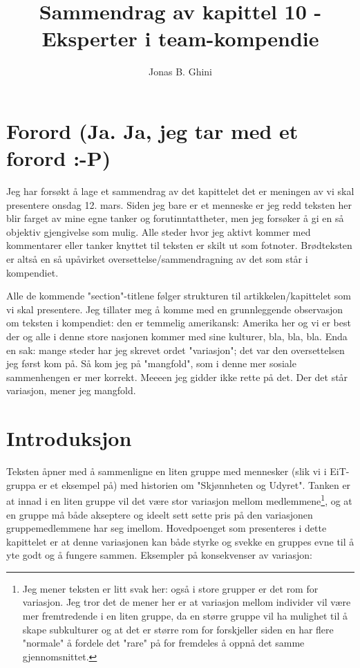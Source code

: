 \documentclass[11pt]{article}
\title{Sammendrag av kapittel 10 - Eksperter i team-kompendie}
\author{Jonas B. Ghini}
\begin{document}
\maketitle

	\section{Forord (Ja. Ja, jeg tar med et forord :-P)}
		Jeg har forsøkt å lage et sammendrag av det kapittelet det er meningen av vi skal presentere onsdag 12. mars. Siden jeg bare er et menneske er jeg redd teksten her blir farget av mine egne tanker og forutinntattheter, men jeg forsøker å gi en så objektiv gjengivelse som mulig. Alle steder hvor jeg aktivt kommer med kommentarer eller tanker knyttet til teksten er skilt ut som fotnoter. Brødteksten er altså en så upåvirket oversettelse/sammendragning av det som står i kompendiet.
		
		 Alle de kommende "section"-titlene følger strukturen til artikkelen/kapittelet som vi skal presentere. Jeg tillater meg å komme med en grunnleggende observasjon om teksten i kompendiet: den er temmelig amerikansk: Amerika her og vi er best der og alle i denne store nasjonen kommer med sine kulturer, bla, bla, bla. Enda en sak: mange steder har jeg skrevet ordet "variasjon"; det var den oversettelsen jeg først kom på. Så kom jeg på "mangfold", som i denne mer sosiale sammenhengen er mer korrekt. Meeeen jeg gidder ikke rette på det. Der det står variasjon, mener jeg mangfold.
				
	\section{Introduksjon}
		Teksten åpner med å sammenligne en liten gruppe med mennesker (slik vi i EiT-gruppa er et eksempel på) med historien om "Skjønnheten og Udyret". Tanken er at innad i en liten gruppe vil det være stor variasjon mellom medlemmene\footnote{Jeg mener teksten er litt svak her: også i store grupper er det rom for variasjon. Jeg tror det de mener her er at variasjon mellom individer vil være mer fremtredende i en liten gruppe, da en større gruppe vil ha mulighet til å skape subkulturer og at det er større rom for forskjeller siden en har flere "normale" å fordele det "rare" på for fremdeles å oppnå det samme gjennomsnittet.}, og at en gruppe må både akseptere og ideelt sett sette pris på den variasjonen gruppemedlemmene har seg imellom.
		\newline \newline
		Hovedpoenget som presenteres i dette kapittelet er at denne variasjonen kan både styrke og svekke en gruppes evne til å yte godt og å fungere sammen. Eksempler på konsekvenser av variasjon:
		
\end{document}
